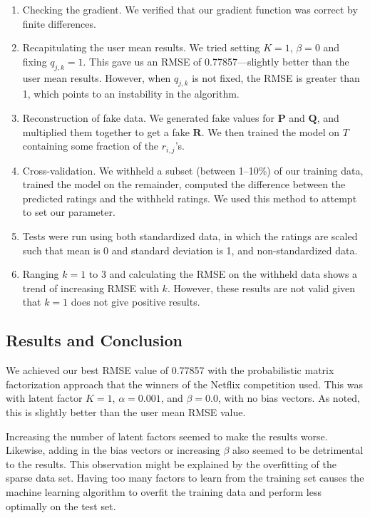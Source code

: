 \documentclass[11pt]{amsart}
\newcommand{\mat}[1]{\mathbf{#1}}
\begin{document}
\begin{enumerate}
\item Checking the gradient. We verified that our gradient function was correct by finite differences.
\item Recapitulating the user mean results. We tried setting $K=1$, $\beta=0$ and fixing $q_{j,k} = 1$. This gave us an RMSE of 0.77857---slightly better than the user mean results. However, when $q_{j,k}$ is not fixed, the RMSE is greater than 1, which points to an instability in the algorithm.
\item Reconstruction of fake data. We generated fake values for $\mat{P}$ and $\mat{Q}$, and multiplied them together to get a fake $\mat{R}$. We then trained the model on $T$ containing some fraction of the $r_{i,j}$'s.  
\item Cross-validation. We withheld a subset (between 1--10\%) of our training data, trained the model on the remainder, computed the difference between the predicted ratings and the withheld ratings. We used this method to attempt to set our parameter.
\item Tests were run using both standardized data, in which the ratings are scaled such that mean is 0 and standard deviation is 1, and non-standardized data.
\item Ranging $k=1$ to 3 and calculating the RMSE on the withheld data shows a trend of increasing RMSE with $k$. However, these results are not valid given that $k=1$ does not give positive results.
 
\end{enumerate}

\subsection{Results and Conclusion}
We achieved our best RMSE value of 0.77857 with the probabilistic matrix factorization approach that the winners of the Netflix competition used. This was with latent factor $K = 1$, $\alpha = 0.001$, and $\beta = 0.0$, with no bias vectors. As noted, this is slightly better than the user mean RMSE value. 

Increasing the number of latent factors seemed to make the results worse. Likewise, adding in the bias vectors or increasing $\beta$ also seemed to be detrimental to the results. This observation might be explained by the overfitting of the sparse data set. Having too many factors to learn from the training set causes the machine learning algorithm to overfit the training data and perform less optimally on the test set.




\end{document}
